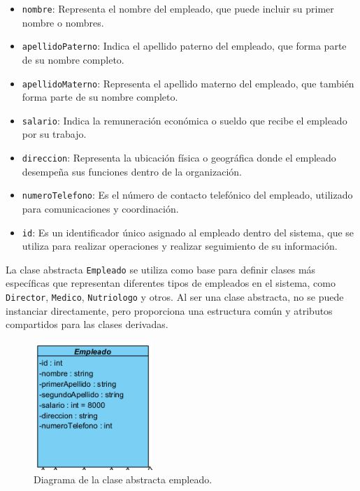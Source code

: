 \begin{itemize}
\item \texttt{nombre}: Representa el nombre del empleado, que puede incluir su primer nombre o nombres.

\item \texttt{apellidoPaterno}: Indica el apellido paterno del empleado, que forma parte de su nombre completo.

\item \texttt{apellidoMaterno}: Representa el apellido materno del empleado, que también forma parte de su nombre completo.

\item \texttt{salario}: Indica la remuneración económica o sueldo que recibe el empleado por su trabajo.

\item \texttt{direccion}: Representa la ubicación física o geográfica donde el empleado desempeña sus funciones dentro de la organización.


\item \texttt{numeroTelefono}: Es el número de contacto telefónico del empleado, utilizado para comunicaciones y coordinación.

\item \texttt{id}: Es un identificador único asignado al empleado dentro del sistema, que se utiliza para realizar operaciones y realizar seguimiento de su información.

\end{itemize}

La clase abstracta \texttt{Empleado} se utiliza como base para definir clases más específicas que representan diferentes tipos de empleados en el sistema, como \texttt{Director}, \texttt{Medico}, \texttt{Nutriologo} y otros. Al ser una clase abstracta, no se puede instanciar directamente, pero proporciona una estructura común y atributos compartidos para las clases derivadas.

\begin{figure}[htbp]
\centering
\includegraphics[width=0.4\textwidth]{images/arqui/empleado.png}
\caption{Diagrama de la clase abstracta empleado.}
\label{fig:entidadempleado}
\end{figure}
\clearpage
